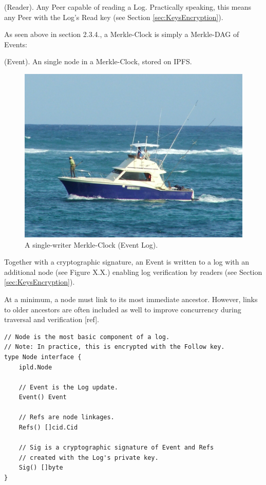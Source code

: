 \documentclass{comjnl}
\begin{document}
\begin{definition}
(Reader). Any Peer capable of reading a Log. Practically speaking, this means any Peer with the Log’s Read key (see Section  \ref{sec:KeysEncryption}).
\end{definition}


As seen above in section 2.3.4., a Merkle-Clock is simply a Merkle-DAG of Events:

\begin{definition}
 (Event). An single node in a Merkle-Clock, stored on IPFS.
\end{definition}

\begin{figure}
  \includegraphics[width=\linewidth]{boat.jpg}
  \caption{A single-writer Merkle-Clock (Event Log).}
  \label{fig:boat1}
\end{figure}

Together with a cryptographic signature, an Event is written to a log with an additional node (see Figure X.X.) enabling log verification by readers (see Section  \ref{sec:KeysEncryption}).

At a minimum, a node must link to its most immediate ancestor. However, links to older ancestors are often included as well to improve concurrency during traversal and verification [ref].

\begin{lstlisting}
// Node is the most basic component of a log.
// Note: In practice, this is encrypted with the Follow key.
type Node interface {
    ipld.Node

    // Event is the Log update.
    Event() Event

    // Refs are node linkages.
    Refs() []cid.Cid

    // Sig is a cryptographic signature of Event and Refs
    // created with the Log's private key.
    Sig() []byte
}
\end{lstlisting}
\end{document}
